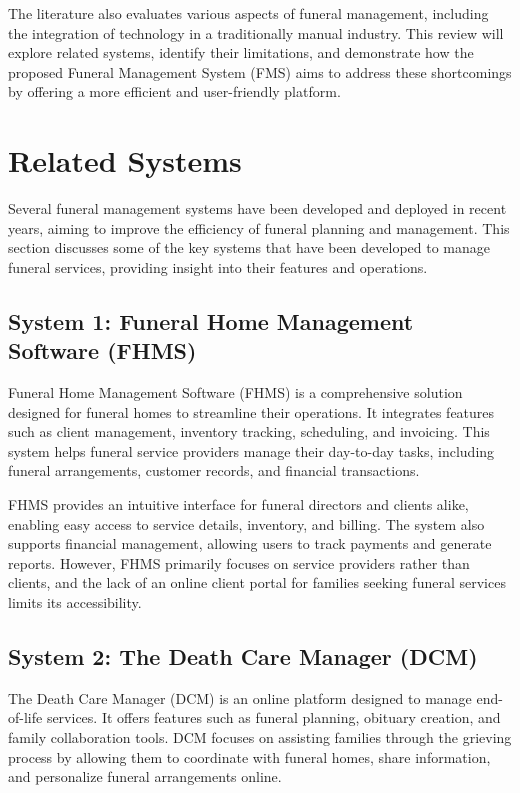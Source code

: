 \documentclass[a4paper,12pt]{report}
\begin{document}
The literature also evaluates various aspects of funeral management, including the integration of technology in a traditionally manual industry. This review will explore related systems, identify their limitations, and demonstrate how the proposed Funeral Management System (FMS) aims to address these shortcomings by offering a more efficient and user-friendly platform.

\section{Related Systems}
Several funeral management systems have been developed and deployed in recent years, aiming to improve the efficiency of funeral planning and management. This section discusses some of the key systems that have been developed to manage funeral services, providing insight into their features and operations.

\subsection{System 1: Funeral Home Management Software (FHMS)}
Funeral Home Management Software (FHMS) is a comprehensive solution designed for funeral homes to streamline their operations. It integrates features such as client management, inventory tracking, scheduling, and invoicing. This system helps funeral service providers manage their day-to-day tasks, including funeral arrangements, customer records, and financial transactions.

FHMS provides an intuitive interface for funeral directors and clients alike, enabling easy access to service details, inventory, and billing. The system also supports financial management, allowing users to track payments and generate reports. However, FHMS primarily focuses on service providers rather than clients, and the lack of an online client portal for families seeking funeral services limits its accessibility.

\subsection{System 2: The Death Care Manager (DCM)}
The Death Care Manager (DCM) is an online platform designed to manage end-of-life services. It offers features such as funeral planning, obituary creation, and family collaboration tools. DCM focuses on assisting families through the grieving process by allowing them to coordinate with funeral homes, share information, and personalize funeral arrangements online. 
\end{document}

